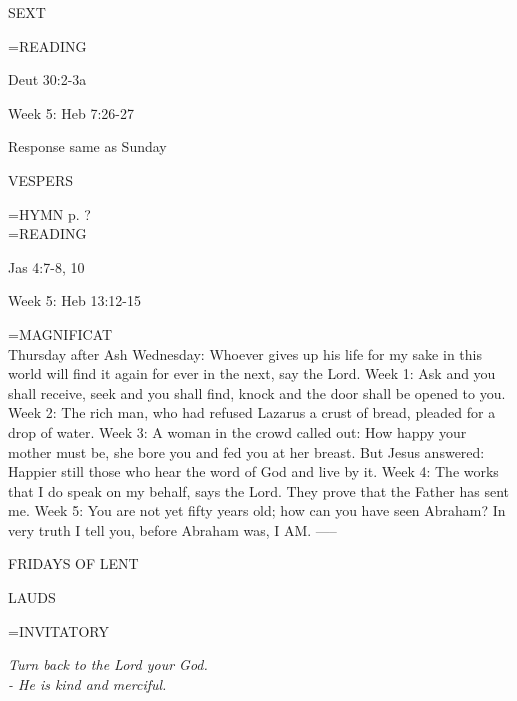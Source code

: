 \begin{flushleft}\normalsize SEXT\\\end{flushleft}
\hangindent=\parindent \small READING
\begin{description}[labelindent=\parindent, leftmargin=*]
\item [Thursday after Ash Wednesday \& Weeks 1-4:]     Deut 30:2-3a \textbf{    }
\end{description}


Week 5:    Heb 7:26-27    

Response same as Sunday

\begin{flushleft}\normalsize VESPERS\\\end{flushleft}
\hangindent=\parindent \small{\uppercase{HYMN} p.  ?\\}
\hangindent=\parindent \small READING
\begin{description}[labelindent=\parindent, leftmargin=*]
\item [Thursday after Ash Wednesday \& Weeks 1-4:]     Jas 4:7-8, 10 \textbf{    }
\end{description}

Week 5:    Heb 13:12-15    

\hangindent=\parindent \small{MAGNIFICAT \\}
Thursday after Ash Wednesday:	Whoever gives up his life for my sake in this world will find it again for ever in the next, say the Lord.
Week 1:	Ask and you shall receive, seek and you shall find, knock and the door shall be opened to you.
Week 2:	The rich man, who had refused Lazarus a crust of bread, pleaded for a drop of water.
Week 3:	A woman in the crowd called out: How happy your mother must be, she bore you and fed you at her breast. But Jesus answered: Happier still those who hear the word of God and live by it.
Week 4:	The works that I do speak on my behalf, says the Lord. They prove that the Father has sent me.
Week 5:	You are not yet fifty years old; how can you have seen Abraham? In very truth I tell you, before Abraham was, I AM.
-----
\begin{center}
\normalsize FRIDAYS OF LENT
\end{center}

\begin{flushleft}\normalsize LAUDS\\\end{flushleft}
\hangindent=\parindent \small{INVITATORY}
\begin{center}
\textit{Turn back to the Lord your God.\\}
\textit{- He is kind and merciful.\\}
\end{center}

